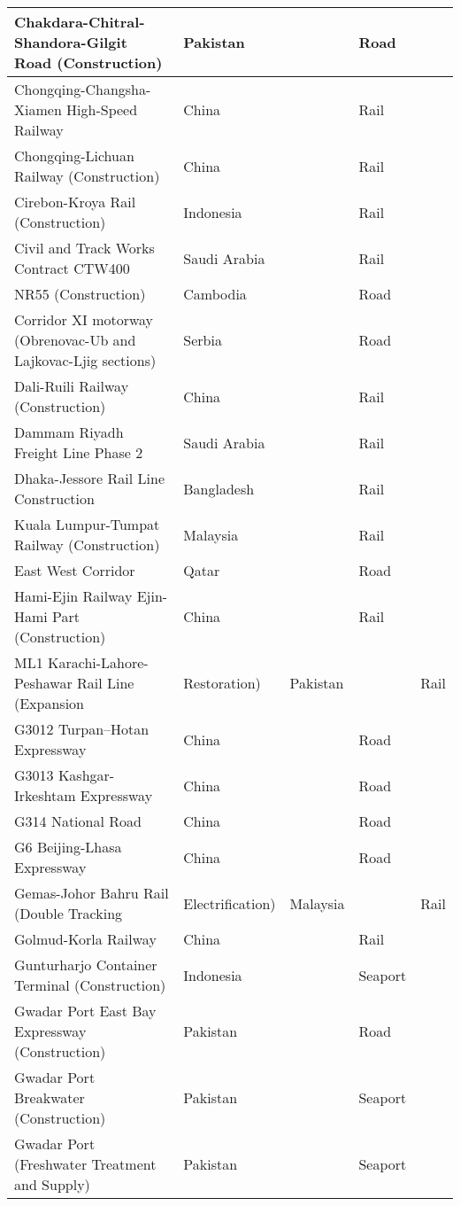 \documentclass{article}
\begin{document}
\begin{center}
\begin{landscape}
\begin{longtable}{p{10cm}p{5cm}p{2cm}p{2cm}}
Chakdara-Chitral-Shandora-Gilgit Road (Construction)	&	Pakistan	&		&	Road	\\	\hline
Chongqing-Changsha-Xiamen High-Speed Railway	&	China 	&		&	Rail	\\	\hline
Chongqing-Lichuan Railway (Construction)	&	China 	&		&	Rail	\\	\hline
Cirebon-Kroya Rail (Construction)	&	Indonesia	&		&	Rail	\\	\hline
Civil and Track Works Contract CTW400	&	Saudi Arabia	&		&	Rail	\\	\hline
NR55 (Construction)	&	Cambodia	&		&	Road	\\	\hline
Corridor XI motorway (Obrenovac-Ub and Lajkovac-Ljig sections)	&	Serbia	&		&	Road	\\	\hline
Dali-Ruili Railway (Construction)	&	China 	&		&	Rail	\\	\hline
Dammam Riyadh Freight Line Phase 2	&	Saudi Arabia	&		&	Rail	\\	\hline
Dhaka-Jessore Rail Line Construction	&	Bangladesh	&		&	Rail	\\	\hline
Kuala Lumpur-Tumpat Railway (Construction)	&	Malaysia	&		&	Rail	\\	\hline
East West Corridor	&	Qatar	&		&	Road	\\	\hline
Hami-Ejin Railway Ejin-Hami Part (Construction)	&	China 	&		&	Rail	\\	\hline
ML1 Karachi-Lahore-Peshawar Rail Line (Expansion & Restoration)	&	Pakistan	&		&	Rail	\\	\hline
G3012 Turpan–Hotan Expressway	&	China 	&		&	Road	\\	\hline
G3013 Kashgar-Irkeshtam Expressway	&	China 	&		&	Road	\\	\hline
G314 National Road	&	China 	&		&	Road	\\	\hline
G6 Beijing-Lhasa Expressway	&	China 	&		&	Road	\\	\hline
Gemas-Johor Bahru Rail (Double Tracking & Electrification)	&	Malaysia	&		&	Rail	\\	\hline
Golmud-Korla Railway	&	China 	&		&	Rail	\\	\hline
Gunturharjo Container Terminal (Construction)	&	Indonesia	&		&	Seaport	\\	\hline
Gwadar Port East Bay Expressway (Construction)	&	Pakistan	&		&	Road	\\	\hline
Gwadar Port Breakwater (Construction)	&	Pakistan	&		&	Seaport	\\	\hline
Gwadar Port (Freshwater Treatment and Supply)	&	Pakistan	&		&	Seaport	\\	\hline

\end{longtable}
\end{landscape}
\end{center}
\end{document}
